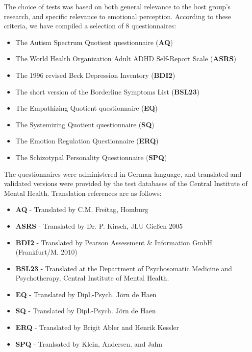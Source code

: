     The choice of tests was based on both general relevance to the host group's research, and specific relevance to emotional perception.
    According to these criteria, we have compiled a selection of 8 questionnaires:
    \begin{itemize}
        \item The Autism Spectrum Quotient questionnaire (\textbf{AQ}) \cite{Baron-Cohen2001}
	\item The World Health Organization Adult ADHD Self-Report Scale (\textbf{ASRS}) \cite{Kessler2005}
	\item The 1996 revised Beck Depression Inventory (\textbf{BDI2}) \cite{Beck1996}
	\item The short version of the Borderline Symptoms List (\textbf{BSL23}) \cite{Bohus2009}
	\item The Empathizing Quotient questionnaire (\textbf{EQ}) \cite{Baron-Cohen2004}
	\item The Systemizing Quotient questionnaire (\textbf{SQ}) \cite{Baron-Cohen2003a}
	\item The Emotion Regulation Questionnaire (\textbf{ERQ}) \cite{Gross2003}
	\item The Schizotypal Personality Questionnaire (\textbf{SPQ}) \cite{Raine1991}
    \end{itemize}
    The questionnaires were administered in German language, and translated and validated versions were provided by the test databases of the Central Institute of Mental Health.
    Translation references are as follows:
    \begin{itemize}
        \item \textbf{AQ} - Translated by C.M. Freitag, Homburg
	\item \textbf{ASRS} - Translated by Dr. P. Kirsch, JLU Gießen 2005
	\item \textbf{BDI2} - Translated by Pearson Assessment \& Information GmbH (Frankfurt/M. 2010)
	\item \textbf{BSL23} - Translated at the Department of Psychosomatic Medicine and Psychotherapy, Central Institute of Mental Health.
	\item \textbf{EQ} - Translated by Dipl.-Psych. Jörn de Haen
	\item \textbf{SQ} - Translated by Dipl.-Psych. Jörn de Haen
	\item \textbf{ERQ} - Translated by Brigit Abler and Henrik Kessler \cite{Abler2009}
	\item \textbf{SPQ} - Tranlsated by Klein, Andersen, and Jahn \cite{Klein1997}
    \end{itemize}

